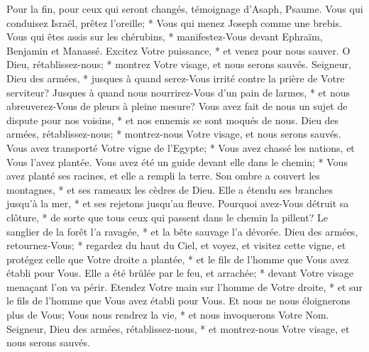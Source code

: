 Pour la fin, pour ceux qui seront changés, témoignage d'Asaph, Psaume.
Vous qui conduisez Israël, prêtez l'oreille; * Vous qui menez Joseph comme une brebis. Vous qui êtes assis sur les chérubins, * manifestez-Vous
devant Ephraïm, Benjamin et Manassé. Excitez Votre puissance, * et venez pour nous sauver.
O Dieu, rétablissez-nous; * montrez Votre visage, et nous serons sauvés.
Seigneur, Dieu des armées, * jusques à quand serez-Vous irrité contre la prière de Votre serviteur?
Jusques à quand nous nourrirez-Vous d'un pain de larmes, * et nous abreuverez-Vous de pleurs à pleine mesure?
Vous avez fait de nous un sujet de dispute pour nos voisins, * et nos ennemis se sont moqués de nous.
Dieu des armées, rétablissez-nous; * montrez-nous Votre visage, et nous serons sauvés.
Vous avez transporté Votre vigne de l'Egypte; * Vous avez chassé les nations, et Vous l'avez plantée.
Vous avez été un guide devant elle dans le chemin; * Vous avez planté ses racines, et elle a rempli la terre.
Son ombre a couvert les montagnes, * et ses rameaux les cèdres de Dieu.
Elle a étendu ses branches jusqu'à la mer, * et ses rejetons jusqu'au fleuve.
Pourquoi avez-Vous détruit sa clôture, * de sorte que tous ceux qui passent dans le chemin la pillent?
Le sanglier de la forêt l'a ravagée, * et la bête sauvage l'a dévorée.
Dieu des armées, retournez-Vous; * regardez du haut du Ciel, et voyez, et visitez cette vigne,
et protégez celle que Votre droite a plantée, * et le fils de l'homme que Vous avez établi pour Vous.
Elle a été brûlée par le feu, et arrachée; * devant Votre visage menaçant l'on va périr.
Etendez Votre main sur l'homme de Votre droite, * et sur le fils de l'homme que Vous avez établi pour Vous.
Et nous ne nous éloignerons plus de Vous; Vous nous rendrez la vie, * et nous invoquerons Votre Nom.
Seigneur, Dieu des armées, rétablissez-nous, * et montrez-nous Votre visage, et nous serons sauvés.

